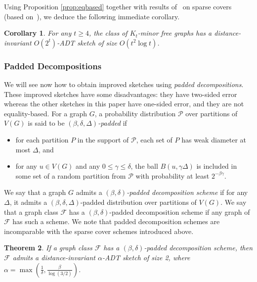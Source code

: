 \documentclass[11pt]{article}
\newtheorem{thm}{Theorem}[section]
\newtheorem{corollary}[thm]{Corollary}
\theoremstyle{definition}
\renewcommand{\le}{\leqslant}
\renewcommand{\ge}{\geqslant}
\def\F {{\mathcal F}}
\begin{document}
Using Proposition \ref{prop:eqbased}  together with results of~\cite{Fil20} on sparse covers (based
on~\cite{KPR93,FT03}), we deduce the following immediate corollary.

\begin{corollary}\label{cor:minor}
For any $t\ge 4$, the class of  $K_t$-minor free graphs has
a distance-invariant  $O(2^t)$-ADT sketch of size 
$O(t^2\log t)$.
\end{corollary}

\subsubsection{Padded Decompositions}
We will see now how to obtain improved sketches using \emph{padded decompositions}. These improved
sketches have some disadvantages: they have two-sided error whereas the other sketches in this paper
have one-sided error, and they are not equality-based.  For a graph $G$, a probability distribution
$\mathcal{P}$ over partitions of $V(G)$ is said to be \emph{$(\beta,\delta,\Delta)$-padded} if
\begin{itemize}
\item for each partition $P$ in the support of $\mathcal{P}$, each set of $P$ has
  weak diameter at most $\Delta$, and
\item for any $u\in V(G)$ and any $0\le \gamma\le \delta$,
  the ball $B(u,\gamma \Delta)$ is included in some set of a random
  partition from $\mathcal{P}$ with probability at least $2^{-\beta\gamma}$.
\end{itemize} 
\noindent
We say that a graph $G$ admits a \emph{$(\beta, \delta)$-padded decomposition scheme} if for any
$\Delta$, it admits a $(\beta, \delta, \Delta)$-padded distribution over partitions of $V(G)$. We say that a
graph class $\F$ has a $(\beta, \delta)$-padded decomposition scheme if any graph of $\F$ has such a
scheme. We note that padded decomposition schemes are incomparable with the
sparse cover schemes introduced above.

\begin{thm}\label{thm:PDSdist}
If a graph class $\F$ has  a $(\beta, \delta)$-padded decomposition scheme, then $\F$ admits a
distance-invariant $\alpha$-ADT sketch of size 2, where $\alpha=\max(\tfrac1{\delta},
\tfrac{\beta}{\log(3/2)})$.
\end{thm}
\end{document}
